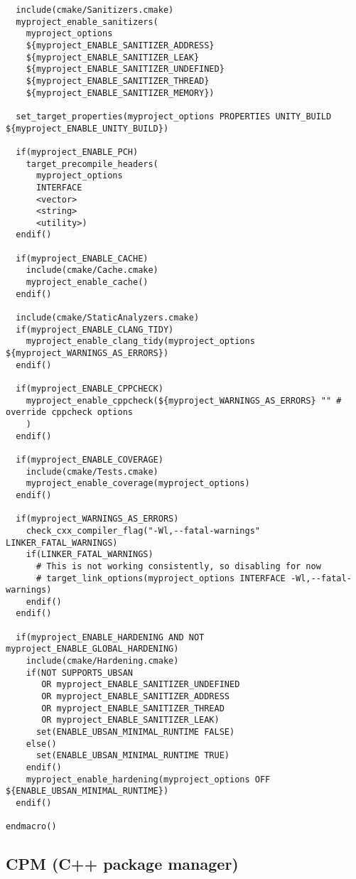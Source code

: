 \begin{verbatim}
  include(cmake/Sanitizers.cmake)
  myproject_enable_sanitizers(
    myproject_options
    ${myproject_ENABLE_SANITIZER_ADDRESS}
    ${myproject_ENABLE_SANITIZER_LEAK}
    ${myproject_ENABLE_SANITIZER_UNDEFINED}
    ${myproject_ENABLE_SANITIZER_THREAD}
    ${myproject_ENABLE_SANITIZER_MEMORY})

  set_target_properties(myproject_options PROPERTIES UNITY_BUILD ${myproject_ENABLE_UNITY_BUILD})

  if(myproject_ENABLE_PCH)
    target_precompile_headers(
      myproject_options
      INTERFACE
      <vector>
      <string>
      <utility>)
  endif()

  if(myproject_ENABLE_CACHE)
    include(cmake/Cache.cmake)
    myproject_enable_cache()
  endif()

  include(cmake/StaticAnalyzers.cmake)
  if(myproject_ENABLE_CLANG_TIDY)
    myproject_enable_clang_tidy(myproject_options ${myproject_WARNINGS_AS_ERRORS})
  endif()

  if(myproject_ENABLE_CPPCHECK)
    myproject_enable_cppcheck(${myproject_WARNINGS_AS_ERRORS} "" # override cppcheck options
    )
  endif()

  if(myproject_ENABLE_COVERAGE)
    include(cmake/Tests.cmake)
    myproject_enable_coverage(myproject_options)
  endif()

  if(myproject_WARNINGS_AS_ERRORS)
    check_cxx_compiler_flag("-Wl,--fatal-warnings" LINKER_FATAL_WARNINGS)
    if(LINKER_FATAL_WARNINGS)
      # This is not working consistently, so disabling for now
      # target_link_options(myproject_options INTERFACE -Wl,--fatal-warnings)
    endif()
  endif()

  if(myproject_ENABLE_HARDENING AND NOT myproject_ENABLE_GLOBAL_HARDENING)
    include(cmake/Hardening.cmake)
    if(NOT SUPPORTS_UBSAN 
       OR myproject_ENABLE_SANITIZER_UNDEFINED
       OR myproject_ENABLE_SANITIZER_ADDRESS
       OR myproject_ENABLE_SANITIZER_THREAD
       OR myproject_ENABLE_SANITIZER_LEAK)
      set(ENABLE_UBSAN_MINIMAL_RUNTIME FALSE)
    else()
      set(ENABLE_UBSAN_MINIMAL_RUNTIME TRUE)
    endif()
    myproject_enable_hardening(myproject_options OFF ${ENABLE_UBSAN_MINIMAL_RUNTIME})
  endif()

endmacro()
\end{verbatim}

\subsection{CPM (C++ package manager)}

